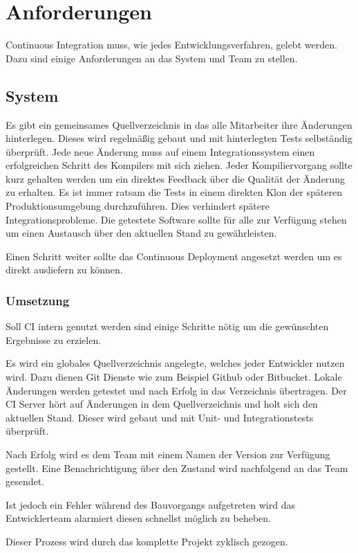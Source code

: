 \chapter{Anforderungen}
Continuous Integration muss, wie jedes Entwicklungsverfahren, gelebt werden. Dazu sind einige Anforderungen an das System und Team zu stellen.

\section{System}
Es gibt ein gemeinsames Quellverzeichnis in das alle Mitarbeiter ihre Änderungen hinterlegen. Dieses wird regelmäßig gebaut und mit hinterlegten Tests selbständig überprüft. Jede neue Änderung muss auf einem Integrationssystem einen erfolgreichen Schritt des Kompilers mit sich ziehen.
Jeder Kompiliervorgang sollte kurz gehalten werden um ein direktes Feedback über die Qualität der Änderung zu erhalten. Es ist immer ratsam die Tests in einem direkten Klon der späteren Produktionsumgebung durchzuführen. Dies verhindert spätere Integrationsprobleme. Die getestete Software sollte für alle zur Verfügung stehen um einen Austausch über den aktuellen Stand zu gewährleisten.

Einen Schritt weiter sollte das Continuous Deployment angesetzt werden um es direkt ausliefern zu können. 

\subsection{Umsetzung}
Soll CI intern genutzt werden sind einige Schritte nötig um die gewünschten Ergebnisse zu erzielen.

Es wird ein globales Quellverzeichnis angelegte, welches jeder Entwickler nutzen wird. Dazu dienen Git Dienste wie zum Beispiel Github oder Bitbucket. Lokale Änderungen werden getestet und nach Erfolg in das Verzeichnis übertragen. Der CI Server hört auf Änderungen in dem Quellverzeichnis und holt sich den aktuellen Stand. Dieser wird gebaut und mit Unit- und Integrationstests überprüft. 

Nach Erfolg wird es dem Team mit einem Namen der Version zur Verfügung gestellt. Eine Benachrichtigung über den Zustand wird nachfolgend an das Team gesendet. 

Ist jedoch ein Fehler während des Bauvorgangs aufgetreten wird das Entwicklerteam alarmiert diesen schnellst möglich zu beheben.

Dieser Prozess wird durch das komplette Projekt zyklisch gezogen.

